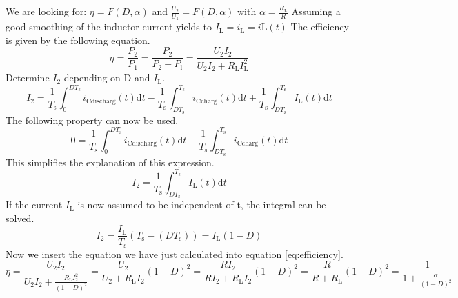 \begin{solutionblock}
We are looking for: $\eta= F(D,\alpha)$ and $\frac{U_\mathrm{2}}{U_\mathrm{1}}=F(D,\alpha)$ with $\alpha=\frac{R_\mathrm{L}}{R}$
Assuming a good smoothing of the inductor current yields to $I_\mathrm{L}=\overline i_\mathrm{L}=i\mathrm{L}(t)$
The efficiency is given by the following equation.
\begin{equation}
    \eta = \frac{P_\mathrm{2}}{P_\mathrm{1}} = \frac{P_\mathrm{2}}{P_\mathrm{2}+P_\mathrm{l}} = \frac{U_\mathrm{2} I_\mathrm{2}}{U_\mathrm{2} I_\mathrm{2} +R_\mathrm{L} I_\mathrm{L}^2} \label{eq:efficiency}
\end{equation}
Determine $I_\mathrm{2}$ depending on D and $I_\mathrm{L}$.
\begin{equation}
    I_\mathrm{2}=\frac{1}{T_\mathrm{s}} \int_{0}^{DT_\mathrm{s}} i_\mathrm{C discharg}(t)\mathrm{d}t-\frac{1}{T_\mathrm{s}} \int_{DT_\mathrm{s}}^{T_\mathrm{s}} i_\mathrm{C charg}(t)\mathrm{d}t+\frac{1}{T_\mathrm{s}} \int_{DT_\mathrm{s}}^{T_\mathrm{s}} I_\mathrm{L}(t)\mathrm{d}t
\end{equation}
The following property can now be used.
\begin{equation}
    0 = \frac{1}{T_\mathrm{s}} \int_{0}^{DT_\mathrm{s}} i_\mathrm{C discharg}(t)\mathrm{d}t-\frac{1}{T_\mathrm{s}} \int_{DT_\mathrm{s}}^{T_\mathrm{s}} i_\mathrm{C charg}(t)\mathrm{d}t
\end{equation}
This simplifies the explanation of this expression.
\begin{equation}
    I_\mathrm{2}= \frac{1}{T_\mathrm{s}} \int_{DT_\mathrm{s}}^{T_\mathrm{s}} I_\mathrm{L}(t)\mathrm{d}t
\end{equation}
If the current $I_\mathrm{L}$ is now assumed to be independent of t, the integral can be solved.
\begin{equation}
    I_\mathrm{2}= \frac{I_\mathrm{L}}{T_\mathrm{s}}(T_\mathrm{s}-(DT_\mathrm{s}))=I_\mathrm{L}(1-D)
\end{equation}
Now we insert the equation we have just calculated into equation \eqref{eq:efficiency}.
\begin{equation}
    \eta=\frac{U_\mathrm{2}I_\mathrm{2}}{U_\mathrm{2}I_\mathrm{2}+\frac{ R_\mathrm{L}I_\mathrm{2}^2}{(1-D)^2}}=\frac{U_\mathrm{2}}{U_\mathrm{2}+R_\mathrm{L}I_\mathrm{2}}{(1-D)^2}=\frac{RI_\mathrm{2}}{RI_\mathrm{2}+R_\mathrm{L}I_\mathrm{2}}{(1-D)^2}=\frac{R}{R+R_\mathrm{L}}{(1-D)^2}=\frac{1}{1+\frac{\alpha}{(1-D)^2}}

\end{equation}
\end{solutionblock}
